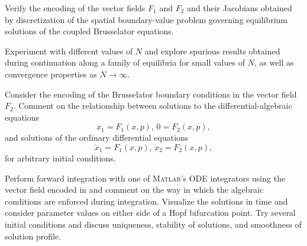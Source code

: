 \begin{exercises}
\item Verify the encoding of the vector fields $F_1$ and $F_2$ and their Jacobians obtained by discretization of the spatial boundary-value problem governing equilibrium solutions of the coupled Brusselator equations.

\item Experiment with different values of $N$ and explore spurious results obtained during continuation along a family of equilibria for small values of $N$, as well as convergence properties as $N\rightarrow\infty$.

\item Consider the encoding of the Brusselator boundary conditions in the vector field $F_2$. Comment on the relationship between solutions to the differential-algebraic equations
\begin{equation}
\dot{x}_1=F_1(x,p),\,0=F_2(x,p),
\end{equation}
and solutions of the ordinary differential equations
\begin{equation}
\dot{x}_1=F_1(x,p),\,\dot{x}_2=F_2(x,p),
\end{equation}
for arbitrary initial conditions.

\item Perform forward integration with one of \textsc{Matlab}'s ODE integrators using the vector field encoded in  and comment on the way in which the algebraic conditions are enforced during integration. Visualize the solutions in time and consider parameter values on either side of a Hopf bifurcation point. Try several initial conditions and discuss uniqueness, stability of solutions, and smoothness of solution profile.
\end{exercises}


